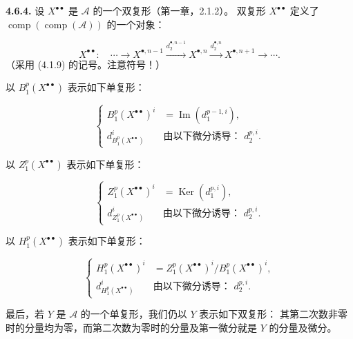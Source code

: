 \clearpage
{}%
\begingroup\small\setlength{\parskip}{0pt}\setlength{\emergencystretch}{1.5em}
\setlength{\abovedisplayskip}{4pt plus 2pt minus 2pt}%
\setlength{\belowdisplayskip}{4pt plus 2pt minus 2pt}%

\noindent\textbf{4.6.4.}\quad
设 $X^{\bullet\bullet}$ 是 $\mathcal A$ 的一个双复形（第一章，2.1.2）。
双复形 $X^{\bullet\bullet}$ 定义了
$\operatorname{comp}(\operatorname{comp}(\mathcal A))$ 的一个对象：

\[
X^{\bullet\bullet}\colon\quad
\cdots\longrightarrow X^{\bullet,n-1}
\xrightarrow{d_2^{\bullet,n-1}}X^{\bullet,n}
\xrightarrow{d_2^{\bullet,n}}X^{\bullet,n+1}
\longrightarrow\cdots.
\]
（采用 (4.1.9) 的记号。注意符号！）

以 $B_1^p(X^{\bullet\bullet})$ 表示如下单复形：

\[
\left\{
\begin{aligned}
B_1^p(X^{\bullet\bullet})^i
  &=\operatorname{Im}(d_1^{p-1,i}),\\
d_{B_1^p(X^{\bullet\bullet})}^{i}
  &\text{由以下微分诱导： }d_2^{p,i}.
\end{aligned}
\right.
\tag{4.6.4.1}
\]

以 $Z_1^p(X^{\bullet\bullet})$ 表示如下单复形：

\[
\left\{
\begin{aligned}
Z_1^p(X^{\bullet\bullet})^i
  &=\operatorname{Ker}(d_1^{p,i}),\\
d_{Z_1^p(X^{\bullet\bullet})}^{i}
  &\text{由以下微分诱导： }d_2^{p,i}.
\end{aligned}
\right.
\tag{4.6.4.2}
\]

以 $H_1^p(X^{\bullet\bullet})$ 表示如下单复形：

\[
\left\{
\begin{aligned}
H_1^p(X^{\bullet\bullet})^i
  &=Z_1^p(X^{\bullet\bullet})^i/B_1^p(X^{\bullet\bullet})^i,\\
d_{H_1^p(X^{\bullet\bullet})}^{i}
  &\text{由以下微分诱导： }d_2^{p,i}.
\end{aligned}
\right.
\tag{4.6.4.3}
\]

最后，若 $Y$ 是 $\mathcal A$ 的一个单复形，我们仍以 $Y$ 表示如下双复形：
其第二次数非零时的分量均为零，而第二次数为零时的分量及第一微分就是 $Y$
的分量及微分。

